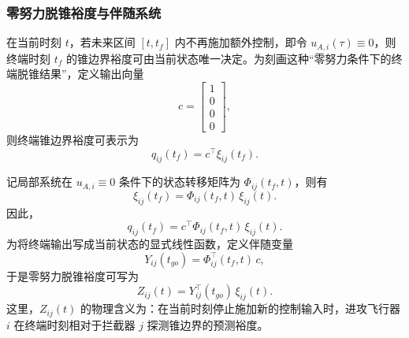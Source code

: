 \subsubsection{零努力脱锥裕度与伴随系统}

在当前时刻 $t$，若未来区间 $[t,t_f]$ 内不再施加额外控制，即令 $u_{A,i}(\tau)\equiv 0$，则终端时刻 $t_f$ 的锥边界裕度可由当前状态唯一决定。为刻画这种“零努力条件下的终端脱锥结果”，定义输出向量
\begin{equation}
c=
\begin{bmatrix}
1\\
0\\
0\\
0
\end{bmatrix},
\end{equation}
则终端锥边界裕度可表示为
\begin{equation}
q_{ij}(t_f)=c^{\top}\xi_{ij}(t_f).
\end{equation}

记局部系统在 $u_{A,i}\equiv 0$ 条件下的状态转移矩阵为 $\Phi_{ij}(t_f,t)$，则有
\begin{equation}
\xi_{ij}(t_f)=\Phi_{ij}(t_f,t)\,\xi_{ij}(t).
\end{equation}
因此，
\begin{equation}
q_{ij}(t_f)=c^{\top}\Phi_{ij}(t_f,t)\,\xi_{ij}(t).
\end{equation}
为将终端输出写成当前状态的显式线性函数，定义伴随变量
\begin{equation}
Y_{ij}(t_{go})=\Phi_{ij}^{\top}(t_f,t)\,c,
\end{equation}
于是零努力脱锥裕度可写为
\begin{equation}
Z_{ij}(t)=Y_{ij}^{\top}(t_{go})\,\xi_{ij}(t).
\end{equation}
这里，$Z_{ij}(t)$ 的物理含义为：在当前时刻停止施加新的控制输入时，进攻飞行器 $i$ 在终端时刻相对于拦截器 $j$ 探测锥边界的预测裕度。

